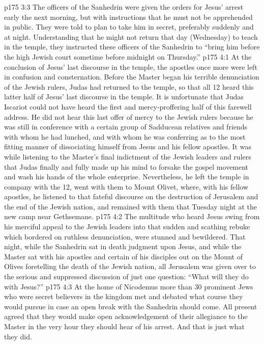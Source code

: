 \vs p175 3:3 The officers of the Sanhedrin were given the orders for Jesus’ arrest early the next morning, but with instructions that he must not be apprehended in public. They were told to plan to take him in secret, preferably suddenly and at night. Understanding that he might not return that day (Wednesday) to teach in the temple, they instructed these officers of the Sanhedrin to “bring him before the high Jewish court sometime before midnight on Thursday.”
\vs p175 4:1 At the conclusion of Jesus’ last discourse in the temple, the apostles once more were left in confusion and consternation. Before the Master began his terrible denunciation of the Jewish rulers, Judas had returned to the temple, so that all 12 heard this latter half of Jesus’ last discourse in the temple. It is unfortunate that Judas Iscariot could not have heard the first and mercy\hyp{}proffering half of this farewell address. He did not hear this last offer of mercy to the Jewish rulers because he was still in conference with a certain group of Sadducean relatives and friends with whom he had lunched, and with whom he was conferring as to the most fitting manner of dissociating himself from Jesus and his fellow apostles. It was while listening to the Master’s final indictment of the Jewish leaders and rulers that Judas finally and fully made up his mind to forsake the gospel movement and wash his hands of the whole enterprise. Nevertheless, he left the temple in company with the 12, went with them to Mount Olivet, where, with his fellow apostles, he listened to that fateful discourse on the destruction of Jerusalem and the end of the Jewish nation, and remained with them that Tuesday night at the new camp near Gethsemane.
\vs p175 4:2 \pc The multitude who heard Jesus swing from his merciful appeal to the Jewish leaders into that sudden and scathing rebuke which bordered on ruthless denunciation, were stunned and bewildered. That night, while the Sanhedrin sat in death judgment upon Jesus, and while the Master sat with his apostles and certain of his disciples out on the Mount of Olives foretelling the death of the Jewish nation, all Jerusalem was given over to the serious and suppressed discussion of just one question: “What will they do with Jesus?”
\vs p175 4:3 \pc At the home of Nicodemus more than 30 prominent Jews who were secret believers in the kingdom met and debated what course they would pursue in case an open break with the Sanhedrin should come. All present agreed that they would make open acknowledgement of their allegiance to the Master in the very hour they should hear of his arrest. And that is just what they did.
